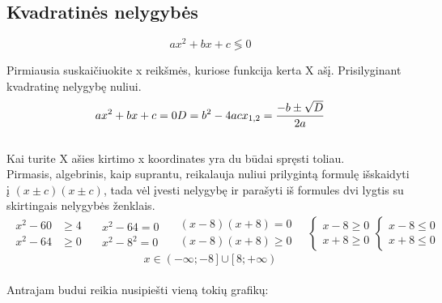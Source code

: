 \subsection{Kvadratinės nelygybės} 

\begin{equation}
    ax^2 + bx + c \lessgtr 0
\end{equation} 

Pirmiausia suskaičiuokite x reikšmės, kuriose funkcija kerta X ašį. Prisilyginant kvadratinę nelygybę nuliui. \\
\begin{equation}
    ax^2 + bx + c = 0 \\
    D = b^2 - 4ac \\
    x_{1, 2} = \frac{-b \pm \sqrt{D}}{2a} 
\end{equation} 
\\
Kai turite X ašies kirtimo x koordinates yra du būdai spręsti toliau.
\\
Pirmasis, algebrinis, kaip suprantu, reikalauja nuliui prilygintą formulę išskaidyti į $(x \pm c)(x \pm c)$, tada vėl įvesti nelygybę ir parašyti iš formules dvi lygtis su skirtingais nelygybės ženklais. 
\begin{align*}
    \begin{aligned}
    x^2 - 60 &\ge 4 \\
    x^2 - 64 &\ge 0
    \end{aligned} \quad
    \begin{aligned}
    x^2 - 64  = 0 \\
    x^2 - 8^2 = 0
    \end{aligned}  \quad
    \begin{aligned}
    (x - 8)(x + 8) = 0 \\
    (x - 8)(x + 8) \ge 0
    \end{aligned}  \quad
    \begin{cases}
        x - 8 \ge 0 \\
        x + 8 \ge 0
    \end{cases}
    \begin{cases}
        x - 8 \le 0 \\
        x + 8 \le 0
    \end{cases}
\end{align*}
\begin{equation*}
    x \in ( -\infty; -8\,] \cup [\,8; +\infty )
\end{equation*}
\\ 
Antrajam budui reikia nusipiešti vieną tokių grafikų:

